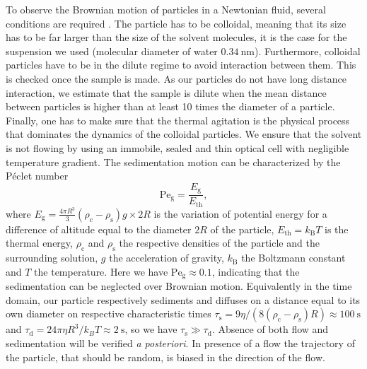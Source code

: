 \documentclass[prb,reprint,amsmath,amssymb]{revtex4-1}
\newcommand{\tg}[1]{{\color{magenta}#1}} %
\begin{document}
To observe the Brownian motion of particles in a Newtonian fluid, several conditions are required \citep{16_CollSusp}. The particle has to be colloidal, meaning that its size has to be far larger than the size of the solvent molecules, it is the case for the suspension we used \tg{(molecular diameter of water \citep{17_marcus1998properties}  $\SI{0.34}{\nano\meter}$)}. Furthermore, colloidal particles have to be in the dilute regime to avoid interaction between them. This is checked once the sample is made. As our particles do not have long distance interaction, we estimate that the sample is dilute when the mean distance between particles is higher than at least 10 times the diameter of a particle. Finally, one has to make sure that the thermal agitation is the physical process that dominates the dynamics of the colloidal particles. We ensure that the solvent is not flowing by using an immobile, sealed and thin optical cell with negligible temperature gradient. The sedimentation motion can be characterized by the P\'eclet number \citep{12_patankar1980numerical, ajp2009saka}
\begin{equation}
\text{Pe}_\text{g} = \frac{E_\text{g}}{E_\text{th}},
\end{equation}
where $E_\text{g} = \frac{4 \pi R^3}{3}  (\rho_\text{c} - \rho_\text{s}) g  \times 2R$ is the variation of potential energy for a difference of altitude equal to the diameter $2R$ of the particle, $E_\text{th} = k_\text{B} T$ is the thermal energy, $\rho_\text{c}$ and $\rho_\text{s}$ the respective densities of the particle and the surrounding solution, $g$ the acceleration of gravity, $k_\text{B}$ the Boltzmann constant and $T$ the temperature. Here we have $\text{Pe}_\text{g} \approx 0.1$, indicating that the sedimentation can be neglected over Brownian motion. Equivalently in the time domain, our particle respectively sediments and diffuses on a distance equal to its own diameter on respective characteristic times $\tau_\text{s}=9\eta/(8(\rho_\text{c}-\rho_\text{s}) R)\approx\SI{100}{\second}$ and $\tau_\text{d}=24\pi\eta R^3/k_BT\approx\SI{2}{\second}$, so we have $\tau_\text{s}\gg\tau_\text{d}$. Absence of both flow and sedimentation will be verified \textit{a posteriori}. In presence of a flow the trajectory of the particle, that should be random, is biased in the direction of the flow.
\end{document}
